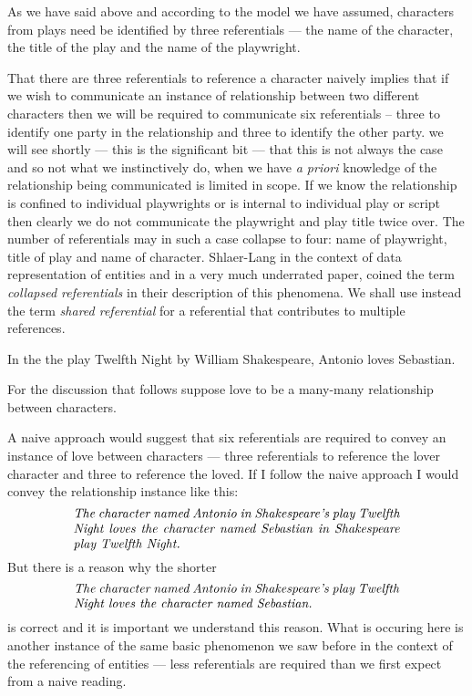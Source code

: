 As we have said above and according to the model we have assumed,
  characters from plays need be identified by three referentials
 --- the name of the character, the title of the play and the name of the playwright.

\mynote 
That there are three referentials to reference a character naively implies that if we wish to communicate an instance of relationship between two different characters then we will be required to communicate six referentials
 -- three to identify one party in the relationship and three to identify the other party. 
 we will see shortly  --- this is the significant bit --- that this is not always the case and so not what we instinctively do, when we have \textit{a priori} knowledge of the relationship being communicated is limited in scope. 
 If we know the relationship is confined to individual playwrights or is internal to individual play 
 or script then clearly we do not 
  communicate the playwright and play title twice over. The number of referentials may in such a case collapse to four:
   name of playwright, title of play and name of character.
Shlaer-Lang in the context of data representation of entities and in a very much underrated paper, coined the term \textit{collapsed referentials} in
their description of this phenomena.  We shall use instead the term \textit{shared referential} for a referential that contributes to multiple references.

\mynote 
In the  the play Twelfth Night by William Shakespeare, Antonio loves Sebastian.

For the discussion that follows suppose love to be a many-many relationship between characters.

A naive approach would suggest that six referentials are required to convey an instance of love
between characters --- three referentials to reference the lover character and three to reference the loved.
If I follow the naive approach I would convey the relationship instance like this:
\begin{equation}
\text{\parbox{9cm}{\textit{The character named Antonio in Shakespeare's play Twelfth Night loves the character named Sebastian in Shakespeare play Twelfth Night.}}}
\end{equation} 
But there is a reason why the shorter
\begin{equation}
\text{\parbox{9cm}{\textit{The character named Antonio in Shakespeare's play Twelfth Night loves the character named Sebastian.}}}
\end{equation} 
is correct and it is  important we understand this reason.
What is occuring here is another instance of the same basic phenomenon we saw before in the context of the referencing of entities --- less referentials are required than we first expect from a naive reading.  

